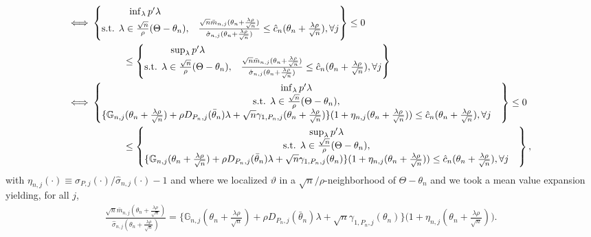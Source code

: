 \documentclass[letterpaper,11pt]{article}
\theoremstyle{myplain}
\theoremstyle{mydefinition}
\theoremstyle{myremark}
\newcommand{\larhon}{\frac{\lambda \rho }{\sqrt n}}
\numberwithin{equation}{section}
\numberwithin{figure}{section}
\begin{document}
\begin{appendices}
\begin{align}
	 \Longleftrightarrow &~  \begin{Bmatrix} \inf_{\lambda} p^\prime\lambda  &   \\ \text{s.t. } \lambda\in \frac{\sqrt n}{\rho }(\Theta-\theta_n), & \frac{\sqrt n\bar{m}_{n,j}(\theta_n+\larhon)}{\hat\sigma_{n,j}(\theta_n+\larhon)}\le  \hat{c}_n(\theta_n+\larhon), \forall j \end{Bmatrix} \leq 0\notag\\
	 &\hspace{0.5in}\leq\begin{Bmatrix} \sup_{\lambda} p'\lambda  &   \\ \text{s.t. } \lambda\in \frac{\sqrt n}{\rho }(\Theta-\theta_n), & \frac{\sqrt n\bar{m}_{n,j}(\theta_n+\larhon)}{\hat\sigma_{n,j}(\theta_n+\larhon)}\le  \hat{c}_n(\theta_n+\larhon), \forall j \end{Bmatrix} \label{eq:rho_appears}\\
	 	 \Longleftrightarrow &~ \begin{Bmatrix} \inf_{\lambda} p^\prime\lambda  &   \\ \text{s.t. } \lambda\in \frac{\sqrt n}{\rho }(\Theta-\theta_n), & \\ \{\mathbb G_{n,j}(\theta_n+\larhon)+\rho  D_{P_n,j}(\bar\theta_n)\lambda+\sqrt{n} \gamma_{1,P_n,j}(\theta_n+\larhon)\}(1+\eta_{n,j}(\theta_n+\larhon))\le  \hat{c}_n(\theta_n+\larhon), \forall j  &  \end{Bmatrix} \leq 0  \notag\\
	 &\hspace{0.5in}\leq\begin{Bmatrix} \sup_{\lambda} p'\lambda  &   \\ \text{s.t. } \lambda\in \frac{\sqrt n}{\rho }(\Theta-\theta_n), & \\ \{\mathbb G_{n,j}(\theta_n+\larhon)+\rho  D_{P_n,j}(\bar\theta_n)\lambda+\sqrt{n} \gamma_{1,P_n,j}(\theta_n)\}(1+\eta_{n,j}(\theta_n+\larhon))\le  \hat{c}_n(\theta_n+\larhon), \forall j  &  \end{Bmatrix} \label{eq:cover_part1},
	 \end{align}
	with $\eta_{n,j}(\cdot)\equiv \sigma_{P,j}(\cdot)/\hat\sigma_{n,j}(\cdot)-1$ and where we localized $\vartheta$ in a $\sqrt n/\rho$-neighborhood of $\Theta-\theta_n$ and we took a mean value expansion yielding, for all $j$,
\begin{align}
\frac{\sqrt n\bar{m}_{n,j}(\theta_n+\larhon)}{\hat\sigma_{n,j}(\theta_n+\larhon)}=\bigl\{\mathbb G_{n,j}(\theta_n+\tfrac{\lambda \rho}{\sqrt{n}})+\rho D_{P_n,j}(\bar\theta_n)\lambda+\sqrt{n} \gamma_{1,P_n,j}(\theta_n)\bigr\}\bigl(1+\eta_{n,j}(\theta_n+\tfrac{\lambda \rho}{\sqrt{n}})\bigr).\label{eq:MVE}

\end{align}
\end{appendices}
\end{document}
